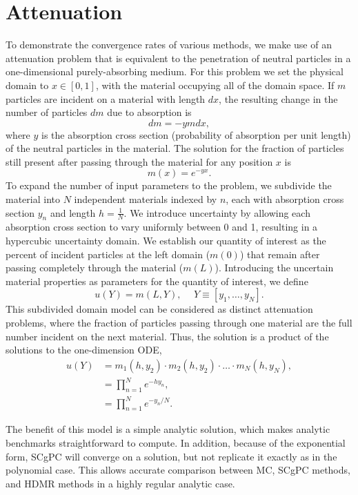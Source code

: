 \section{Attenuation}
To demonstrate the convergence rates of various methods, we make use of an attenuation problem that
is equivalent to the penetration of neutral particles in a one-dimensional purely-absorbing medium.  For this
problem we set the physical domain to $x\in[0,1]$, with the material occupying all of the domain space.  If $m$
particles are incident on a material with length $dx$, the resulting change in the number of particles $dm$
due to absorption is
\begin{equation}
  dm = -y m dx,
\end{equation}
where $y$ is the absorption cross section (probability of absorption per unit length) of the neutral particles
in the material.  The solution for the fraction of particles still present after passing through the material
for any position $x$ is
\begin{equation}
  m(x) = e^{-yx}.
\end{equation}
To expand the number of input parameters to the problem, we subdivide the material into $N$ independent
materials indexed by $n$, each with absorption cross section $y_n$ and length $h=\frac{1}{N}$.  We introduce uncertainty
by allowing each absorption cross section to vary uniformly between 0 and 1, resulting in a hypercubic
uncertainty domain.  We establish our quantity of interest as the percent of incident particles at the left
domain ($m(0)$) that remain after passing completely through the material ($m(L)$).  Introducing the
uncertain material properties as parameters for the quantity of interest, we define
\begin{equation}
  u(Y) = m(L,Y),\hspace{15pt}Y\equiv[y_1,\ldots,y_N].
\end{equation}
This subdivided domain model can be considered as distinct attenuation problems, where the fraction of
particles passing through one material are the full number incident on the next material.  Thus, the solution
is a product of the solutions to the one-dimension ODE,
\begin{align}
  u(Y) &= m_1(h,y_2)\cdot m_2(h,y_2)\cdot\ldots\cdot m_N(h,y_N),\\
    &= \prod_{n=1}^N e^{-h y_n},\\
    &= \prod_{n=1}^N e^{-y_n/N}.
\end{align}

The benefit of this model is a simple analytic solution, which makes analytic benchmarks straightforward to
compute.  In
addition, because of the exponential form, SCgPC will converge on a solution, but not replicate it exactly as
in the polynomial case.  This allows accurate comparison between MC, SCgPC methods, and HDMR methods in a
highly regular analytic case.

